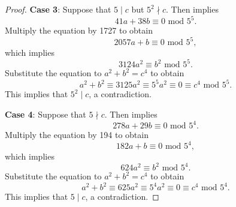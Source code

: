 \documentclass[12pt]{amsart}
\numberwithin{equation}{section} %
\theoremstyle{definition} \newtheorem{definition}[counter]{Definition}
\theoremstyle{remark} \newtheorem{nonexam}[counter]{Non-example}
\begin{document}
\begin{proof}
    \medskip 

    \textbf{Case 3}: Suppose that $5 \mid c$ but $5^2 \nmid c$. Then  implies
    \begin{equation*}
        41a + 38b \equiv 0 \text{ mod } 5^5.
    \end{equation*}
    Multiply the equation by 1727 to obtain
    \begin{equation*}
        2057a + b \equiv 0 \text{ mod } 5^5,
    \end{equation*}
    which implies
    \begin{equation*}
        3124a^2 \equiv b^2 \text{ mod } 5^5.
    \end{equation*}
    Substitute the equation to $a^2 + b^2 = c^4$ to obtain
    \begin{equation*}
        a^2 + b^2 \equiv 3125 a^2 \equiv 5^5 a^2 \equiv 0 \equiv c^4 \text{ mod } 5^5.
    \end{equation*}
    This implies that $5^2 \mid c$, a contradiction.

    \medskip 

    \textbf{Case 4}: Suppose that $5 \nmid c$. Then  implies
    \begin{equation*}
        278a + 29b \equiv 0 \text{ mod } 5^4.
    \end{equation*}
    Multiply the equation by 194 to obtain
    \begin{equation*}
        182a + b \equiv 0 \text{ mod } 5^4,
    \end{equation*}
    which implies
    \begin{equation*}
        624a^2 \equiv b^2 \text{ mod } 5^4.
    \end{equation*}
    Substitute the equation to $a^2 + b^2 = c^4$ to obtain
    \begin{equation*}
        a^2 + b^2 \equiv 625 a^2 \equiv 5^4 a^2 \equiv 0 \equiv c^4 \text{ mod } 5^4.
    \end{equation*}
    This implies that $5 \mid c$, a contradiction.
\end{proof}
\end{document}
